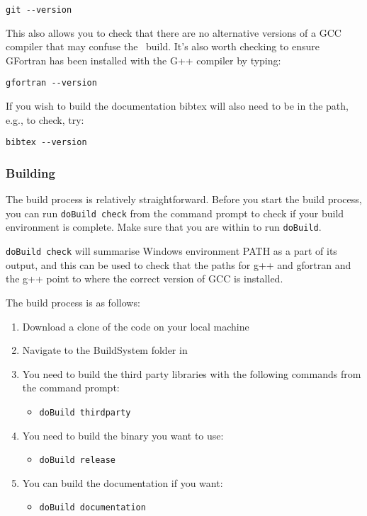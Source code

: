 \texttt{git -{}-version}

This also allows you to check that there are no alternative versions of a GCC compiler that may confuse the \CNAME\ build. It’s also worth checking to ensure GFortran has been installed with the G++ compiler by typing:

\texttt{gfortran -{}-version}

If you wish to build the documentation bibtex will also need to be in the path, e.g., to check, try:

\texttt{bibtex -{}-version}

\subsubsection{Building \CNAME}

The build process is relatively straightforward. Before you start the build process, you can run \texttt{doBuild check} from the command prompt to check if your build environment is complete. Make sure that you are within  to run \texttt{doBuild}. 

\texttt{doBuild check} will summarise Windows environment PATH as a part of its output, and this can be used to check that the paths for g++ and gfortran and the g++ point to where the correct version of GCC is installed. 

The build process is as follows: 
\begin{enumerate}
  \item Download a clone of the code on your local machine
  \item Navigate to the BuildSystem folder in 
  \item You need to build the third party libraries with the following commands from the command prompt:
  \begin{itemize}
    \item \texttt{doBuild thirdparty}
  \end{itemize}
  \item You need to build the binary you want to use:
  \begin{itemize}
    \item \texttt{doBuild release}
  \end{itemize}
  \item You can build the documentation if you want:
  \begin{itemize}
    \item \texttt{doBuild documentation}
  \end{itemize}
\end{enumerate}


